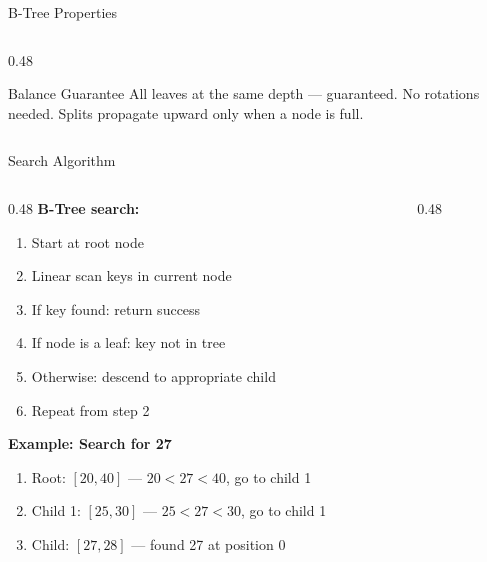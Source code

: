 \documentclass[aspectratio=169, 10pt]{beamer}
\begin{document}
\begin{frame}{B-Tree Properties}
\begin{columns}[T]
\begin{column}{0.48\textwidth}
\vspace{0.3em}
\begin{block}{Balance Guarantee}
All leaves at the same depth --- guaranteed.
No rotations needed. Splits propagate upward
only when a node is full.
\end{block}
\end{column}
\end{columns}
\end{frame}

\begin{frame}{Search Algorithm}
\begin{columns}[T]
\begin{column}{0.48\textwidth}
\textbf{B-Tree search:}
\begin{enumerate}
  \item Start at root node
  \item Linear scan keys in current node
  \item If key found: return success
  \item If node is a leaf: key not in tree
  \item Otherwise: descend to appropriate child
  \item Repeat from step 2
\end{enumerate}

\vspace{0.5em}
\textbf{Example: Search for 27}
\begin{enumerate}
  \item Root: $[20, 40]$ --- $20 < 27 < 40$, go to child 1
  \item Child 1: $[25, 30]$ --- $25 < 27 < 30$, go to child 1
  \item Child: $[27, 28]$ --- found 27 at position 0
\end{enumerate}
\end{column}

\begin{column}{0.48\textwidth}
\begin{center}
\end{center}


\end{column}
\end{columns}
\end{frame}
\end{document}
